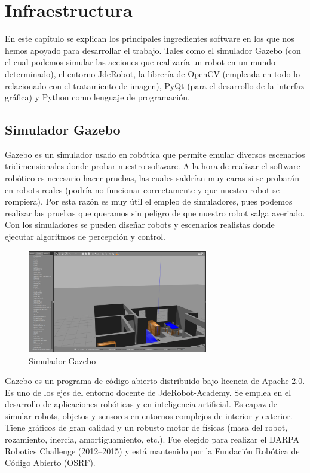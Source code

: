 \chapter{Infraestructura}\label{cap.infraestructura}
En este capítulo se explican los principales ingredientes software en los que nos hemos apoyado  para desarrollar el trabajo. Tales como el simulador Gazebo (con el cual podemos simular las acciones que realizaría un robot en un mundo determinado), el entorno JdeRobot, la librería de OpenCV (empleada en todo lo relacionado con el tratamiento de imagen), PyQt (para el desarrollo de la interfaz gráfica) y Python como lenguaje de programación.

\section{Simulador Gazebo}
Gazebo es un simulador usado en robótica que permite emular diversos escenarios tridimensionales donde probar nuestro software. A la hora de realizar el software robótico es necesario hacer pruebas, las cuales saldrían muy caras si se probarán en robots reales (podría no funcionar correctamente y que nuestro robot se rompiera). Por esta razón es muy útil el empleo de simuladores, pues podemos realizar las pruebas que queramos sin peligro de que nuestro robot salga averiado. Con los simuladores se pueden diseñar robots y escenarios realistas donde ejecutar algoritmos de percepción y control.

\begin{figure}[H]
  \begin{center}
    \includegraphics[width=0.7\textwidth]{figures/Infraestructura/gazebo.png}
		\caption{Simulador Gazebo}
		\label{fig.gazebo}
		\end{center}
\end{figure}

Gazebo es un programa de código abierto distribuido bajo licencia de Apache 2.0. Es uno de los ejes del entorno docente de JdeRobot-Academy.  Se emplea en el desarrollo de aplicaciones robóticas y en inteligencia artificial. Es capaz de simular robots, objetos y sensores en entornos complejos de interior y exterior. Tiene gráficos de gran calidad y un robusto motor de físicas (masa del robot, rozamiento, inercia, amortiguamiento, etc.). Fue elegido para realizar el DARPA Robotics Challenge (2012--2015) y está mantenido por la Fundación Robótica de Código Abierto (OSRF).\\

